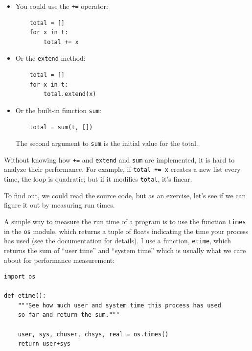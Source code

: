 \documentclass[10pt]{book}
\begin{document}
\begin{itemize}

\item You could use the {\tt +=} operator:

\begin{verbatim}
    total = []
    for x in t:
        total += x
\end{verbatim}

\item Or the {\tt extend} method:

\begin{verbatim}
    total = []
    for x in t:
        total.extend(x)
\end{verbatim}

\item Or the built-in function {\tt sum}:

\begin{verbatim}
    total = sum(t, [])
\end{verbatim}

The second argument to {\tt sum} is the initial value for the total.

\end{itemize}

Without knowing how {\tt +=} and {\tt extend} and {\tt sum} are
implemented, it is hard to analyze their performance.  For example,
if {\tt total += x} creates a new list every time, the loop
is quadratic; but if it modifies {\tt total}, it's linear.

To find out, we could read the source code, but as an exercise, let's see
if we can figure it out by measuring run times.

A simple way to measure the run time of a program is to use
the function {\tt times} in the {\tt os} module, which returns
a tuple of floats indicating the time your process has used
(see the documentation for details).  I use a function, {\tt etime},
which returns the sum of ``user time'' and ``system time'' which
is usually what we care about for performance measurement:

\begin{verbatim}
import os

def etime():
    """See how much user and system time this process has used
    so far and return the sum."""

    user, sys, chuser, chsys, real = os.times()
    return user+sys
\end{verbatim}
\end{document}
